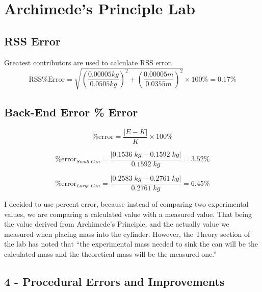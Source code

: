 \chapter*{Archimede's Principle Lab}

\section*{RSS Error}

\begin{center}
  \noindent Greatest contributors are used to calculate RSS error.
  \begin{equation*}
      \text{RSS\% Error} = \sqrt{ \left( \frac{0.00005 kg}{0.0505 kg} \right)^2 
      + \left( \frac{0.00005 m}{0.0355 m} \right)^2}
      \times 100\% = 0.17\%
  \end{equation*}
\end{center}

\section*{Back-End Error \% Error}

  \begin{equation*}
      \% \text{error} = \frac{|E - K|}{K} \times 100 \% 
  \end{equation*}

  \begin{equation*}
      \% \text{error}_{Small \; Can} = \frac{|0.1536 \; kg - 0.1592 \; kg|}{0.1592 \; kg} = 3.52\%
  \end{equation*}

  \begin{equation*}
      \% \text{error}_{Large \; Can} = \frac{|0.2583 \; kg - 0.2761 \; kg|}{0.2761 \; kg} = 6.45\%
  \end{equation*}

  \noindent I decided to use percent error, because instead of comparing two experimental values,
  we are comparing a calculated value with a measured value. That being the value derived from 
  Archimede's Principle, and the actually value we measured when placing mass into the cylinder.
  However, the Theory section of the lab has noted that ``the experimental mass needed to sink the
  can will be the calculated mass and the theoretical mass will be the measured one.''

  \newpage

  \section*{4 - Procedural Errors and Improvements}


